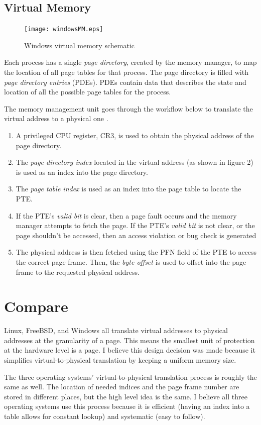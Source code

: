 \documentclass[onecolumn,draftclsnofoot, 10pt, compsoc]{IEEEtran}
\begin{document}
	\subsection{Virtual Memory}
		\begin{figure}[H]
			\texttt{[image: windowsMM.eps]}
			\centering
			\caption{Windows virtual memory schematic \cite{windowsMM}}
			\label{fig:mesh1}
		\end{figure}
		
		Each process has a single \textit{page directory}, created by the memory manager, to map the location of all page tables for that process.
		The page directory is filled with \textit{page directory entries} (PDEs).
		PDEs contain data that describes the state and location of all the possible page tables for the process. 
		
		The memory management unit goes through the workflow below to translate the virtual address to a physical one \cite{windowsMM}.
		\begin{enumerate}
			\item{
				A privileged CPU register, CR3, is used to obtain the physical address of the page directory.
			}
			\item{
				The \textit{page directory index} located in the virtual address (as shown in figure 2) is used as an index into the page directory.}
			\item{
				The \textit{page table index} is used as an index into the page table to locate the PTE.}
			\item{
				If the PTE's \textit{valid bit} is clear, then a page fault occurs and the memory manager attempts to fetch the page.
				If the PTE's \textit{valid bit} is not clear, or the page shouldn't be accessed, then an access violation or bug check is generated}
			\item{
				The physical address is then fetched using the PFN field of the PTE to access the correct page frame.
				Then, the \textit{byte offset} is used to offset into the page frame to the requested physical address.}
	\end{enumerate}
\section{Compare}
	Linux, FreeBSD, and Windows all translate virtual addresses to physical addresses at the granularity of a page.
	This means the smallest unit of protection at the hardware level is a page. 
	I believe this design decision was made because it simplifies virtual-to-physical translation by keeping a uniform memory size.
	
	The three operating systems' virtual-to-physical translation process is roughly the same as well.
	The location of needed indices and the page frame number are stored in different places, but the high level idea is the same.
	I believe all three operating systems use this process because it is efficient (having an index into a table allows for constant lookup) and systematic (easy to follow).
	
	
	


\end{document}
